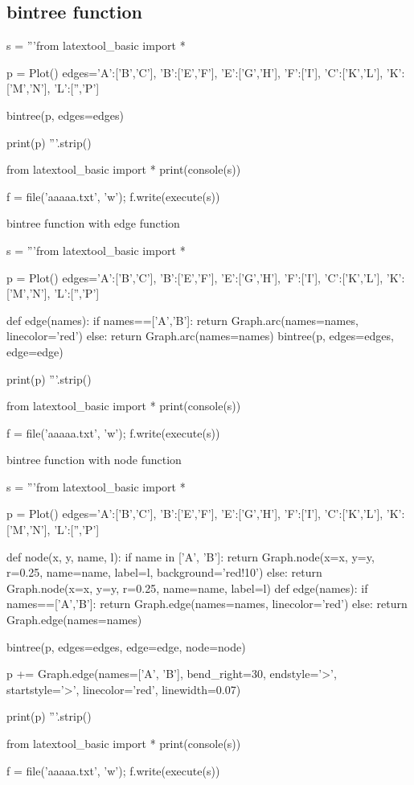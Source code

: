 \newpage
\subsection{bintree function}

\begin{python}
s = '''from latextool_basic import *

p = Plot()
edges={'A':['B','C'],
       'B':['E','F'],
       'E':['G','H'],
       'F':['I'],
       'C':['K','L'],
       'K':['M','N'],
       'L':['','P']}

bintree(p, edges=edges)

print(p)
'''.strip()

from latextool_basic import *
print(console(s))

f = file('aaaaa.txt', 'w'); f.write(execute(s))
\end{python}





\newpage
bintree function with edge function
\begin{python}
s = '''from latextool_basic import *

p = Plot()
edges={'A':['B','C'],
       'B':['E','F'],
       'E':['G','H'],
       'F':['I'],
       'C':['K','L'],
       'K':['M','N'],
       'L':['','P']}

def edge(names):
    if names==['A','B']:
        return Graph.arc(names=names, linecolor='red')
    else:
        return Graph.arc(names=names)
bintree(p, edges=edges, edge=edge)

print(p)
'''.strip()

from latextool_basic import *
print(console(s))

f = file('aaaaa.txt', 'w'); f.write(execute(s))
\end{python}




\newpage
bintree function with node function
\begin{python}
s = '''from latextool_basic import *

p = Plot()
edges={'A':['B','C'],
       'B':['E','F'],
       'E':['G','H'],
       'F':['I'],
       'C':['K','L'],
       'K':['M','N'],
       'L':['','P']}

def node(x, y, name, l):
    if name in ['A', 'B']:
        return Graph.node(x=x, y=y, r=0.25, name=name, label=l, background='red!10')
    else:
        return Graph.node(x=x, y=y, r=0.25, name=name, label=l)
def edge(names):
    if names==['A','B']:
        return Graph.edge(names=names, linecolor='red')
    else:
        return Graph.edge(names=names)

bintree(p, edges=edges, edge=edge, node=node)

p += Graph.edge(names=['A', 'B'],
     bend_right=30, 
     endstyle='>', startstyle='>', linecolor='red', linewidth=0.07)

print(p)
'''.strip()

from latextool_basic import *
print(console(s))

f = file('aaaaa.txt', 'w'); f.write(execute(s))
\end{python}






